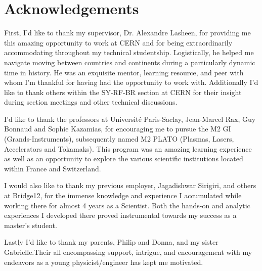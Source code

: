 \chapter*{Acknowledgements}
\thispagestyle{empty}

First, I'd like to thank my supervisor, Dr. Alexandre Lasheen, for providing me this amazing opportunity to work at CERN and for being extraordinarily accommodating throughout my technical studentship. Logistically, he helped me navigate moving between countries and continents during a particularly dynamic time in history. He was an exquisite mentor, learning resource, and peer with whom I'm thankful for having had the opportunity to work with. Additionally I'd like to thank others within the SY-RF-BR section at CERN for their insight during section meetings and other technical discussions.

I'd like to thank the professors at Université Paris-Saclay, Jean-Marcel Rax, Guy Bonnaud and Sophie Kazamias, for encouraging me to pursue the M2 GI (Grands-Instruments), subsequently named M2 PLATO (Plasmas, Lasers, Accelerators and Tokamaks). This program was an amazing learning experience as well as an opportunity to explore the various scientific institutions located within France and Switzerland.

I would also like to thank my previous employer, Jagadishwar Sirigiri, and others at Bridge12, for the immense knowledge and experience I accumulated  while working there for  almost 4 years as a Scientist. Both the hands-on and analytic experiences I developed there proved instrumental towards my success as a master's student.

Lastly I'd like to thank my parents, Philip and Donna, and my sister Gabrielle.Their all encompassing support, intrigue, and encouragement with my endeavors as a young physicist/engineer has kept me motivated.